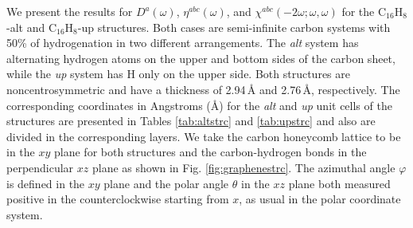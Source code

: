 \documentclass[pss]{wiley2sp} %
\begin{document}
We present the results for {$D^{a}(\omega)$}, {$\eta^{abc}(\omega)$}, and
$\chi^{abc}(-2\omega;\omega,\omega)$ for the C$_{16}$H$_{8}$-alt and
C$_{16}$H$_{8}$-up structures. Both cases are semi-infinite carbon systems with
50\% of hydrogenation in two different arrangements. The \emph{alt} system has
alternating hydrogen atoms on the upper and bottom sides of the carbon sheet,
while the \emph{up} system has H only on the upper side. Both structures are
noncentrosymmetric and have a thickness of 2.94\,{\AA} and 2.76\,{\AA},
respectively. The corresponding coordinates in Angstroms (\AA) for the
\emph{alt} and \emph{up} unit cells of the structures are presented in Tables
\ref{tab:altstrc} and \ref{tab:upstrc} and also are divided in the corresponding
layers. We take the carbon honeycomb lattice to be in the $xy$ plane for both 
structures and the carbon-hydrogen bonds in the perpendicular $xz$ plane as shown in Fig.
\ref{fig:graphenestrc}. The azimuthal angle $\varphi$ is defined in the $xy$
plane and the polar angle $\theta$ in the $xz$ plane both measured positive in
the counterclockwise starting from $x$, as usual in the polar coordinate system.
\end{document}

